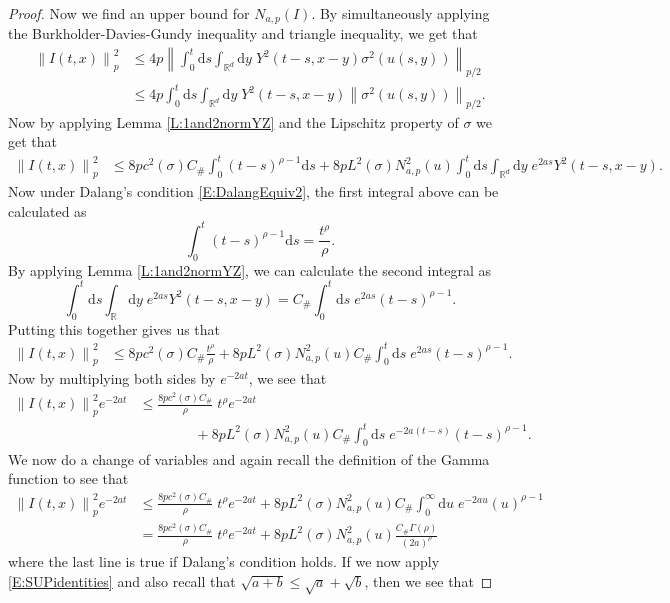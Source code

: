 \documentclass[a4paper,11pt]{article}
\numberwithin{equation}{section}
\theoremstyle{plain}
\theoremstyle{definition}
\newcommand{\ud}{\ensuremath{\mathrm{d} }}
\newcommand{\Norm}[1]{\left\|  #1   \right\|}
\newcommand{\R}{\mathbb{R}}
\numberwithin{NQ}{section}
\numberwithin{LQ}{section}
\numberwithin{ZQ}{section}
\begin{document}
\begin{proof}
		Now we find an upper bound for $N_{a,p}(I)$. By simultaneously applying the Burkholder-Davies-Gundy inequality and triangle inequality, we get that  
		\begin{align*}
		\Norm{I(t,x)}_p^2 &\le 4p \Norm{\int_0^t \ud s \int_{\R^d}\ud y \; Y^2(t-s,x-y)\sigma^2(u(s,y))  }_{p/2}
		\\&\le 4p \int_0^t \ud s \int_{\R^d} \ud y \; Y^2(t-s,x-y)\Norm{\sigma^2(u(s,y))}_{p/2}.
		\end{align*}
		Now by applying Lemma \ref{L:1and2normYZ} and the Lipschitz property of $\sigma$ we get that 
		\begin{align*}
		\Norm{I(t,x)}_p^2 &\le 8pc^2(\sigma)C_{\#}\int_0^t (t-s)^{\rho -1} \ud s + 8pL^2(\sigma)N^2_{a,p}(u)\int_0^t \ud s \int_{\R^d} \ud y \; e^{2as} Y^2(t-s,x-y).
		\end{align*} 
		Now under Dalang's condition \eqref{E:DalangEquiv2}, the first integral above can be calculated as 
		\[
		\int_0^t (t-s)^{\rho -1} \ud s = \frac{ t^{\rho} }{\rho}.
		\]
		By applying Lemma \ref{L:1and2normYZ}, we can calculate the second integral as 
		\[
		\int_0^t \ud s \int_{\R} \ud y \; e^{2as} Y^2(t-s,x-y) = C_{\#}\int_0^t \ud s \; e^{2as}(t-s)^{\rho - 1}.
		\]
		Putting this together gives us that 
		\begin{align*}
		\Norm{I(t,x)}_p^2 &\le 8pc^2(\sigma)C_{\#} \frac{ t^{\rho} }{\rho} + 8pL^2(\sigma)N^2_{a,p}(u) C_{\#}\int_0^t \ud s \; e^{2as}(t-s)^{\rho - 1}.
		\end{align*}
		Now by multiplying both sides by $e^{-2at}$, we see that
		\begin{align*}
		\Norm{I(t,x)}_p^2e^{-2at} &\le \frac{8pc^2(\sigma)C_{\#} }{\rho} \; t^{\rho} e^{-2at} 
		\\&\qquad\qquad + 8pL^2(\sigma)N^2_{a,p}(u) C_{\#} \int_0^t \ud s \; e^{-2a(t-s)}(t-s)^{\rho - 1}.
		\end{align*}
		We now do a change of variables and again recall the definition of the Gamma function to see that 
		\begin{align*}
		\Norm{I(t,x)}_p^2e^{-2at}  &\le \frac{8pc^2(\sigma)C_{\#} }{\rho} \; t^{\rho} e^{-2at} + 8pL^2(\sigma)N^2_{a,p}(u) C_{\#} \int_0^\infty \ud u \; e^{-2au}(u)^{\rho -1} \\
		& = \frac{8pc^2(\sigma)C_{\#} }{\rho} \; t^{\rho} e^{-2at} + 8pL^2(\sigma)N^2_{a,p}(u) \frac{C_{\#}\Gamma\left(\rho \right)}{ (2a)^{\rho}}
		\end{align*}
		where the last line is true if Dalang's condition \cite{CHN19} holds. If we now apply \eqref{E:SUPidentities} and also recall that $\sqrt{a+b} \le \sqrt{a} + \sqrt{b}$, then we see that 

\end{proof}
\end{document}
